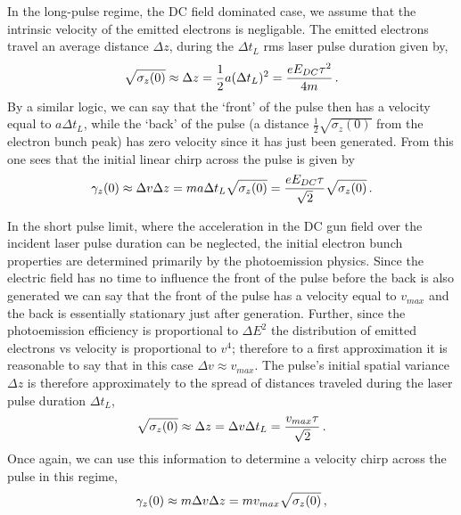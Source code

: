 In the long-pulse regime, the DC field dominated case, we assume that the intrinsic velocity of the emitted electrons is negligable.
The emitted electrons travel an average distance $ \Delta z $, during the $ \Delta t_{ L } $ rms laser pulse duration given by,
\begin{equation}
  \sqrt{ \sigma_{ z } ( 0 ) } \approx \Delta z = \frac{ 1 }{ 2 } a ( \Delta t_{L} )^{ 2 }  = \frac{ e E_{ DC } \tau^{ 2 } }{ 4 m } \, \text{.}
\end{equation}
By a similar logic, we can say that the `front' of the pulse then has a velocity equal to $ a \Delta t_{ L } $, while the `back' of the pulse (a distance $ \frac{ 1 }{ 2 } \sqrt{ \sigma_{ z } ( 0 ) } $ from the electron bunch peak) has zero velocity since it has just been generated. From this one sees that the initial linear chirp across the pulse is given by 
\begin{equation}
  \gamma_{ z } ( 0 ) \approx \Delta v \Delta z = m a \Delta t_{ L } \sqrt{ \sigma_{ z } ( 0 ) } = \frac{ e E_{ DC } \tau }{ \sqrt{ 2 } }\sqrt{ \sigma_{ z } ( 0 ) } \, \text{.}
\end{equation} 

In the short pulse limit, where the acceleration in the DC gun field over the incident laser pulse duration can be neglected, the initial electron bunch properties are determined primarily by the photoemission physics.
Since the electric field has no time to influence the front of the pulse before the back is also generated we can say that the front of the pulse has a velocity equal to $v_{max}$ and the back is essentially stationary just after generation.
Further, since the photoemission efficiency is proportional to $\Delta E^2$ \cite{shalaev_electron_1994} the distribution of emitted electrons vs velocity is proportional to $v^4$; therefore to a first approximation it is reasonable to say that in this case $\Delta v \approx v_{max}$.
The pulse's initial spatial variance $\Delta z$ is therefore approximately to the spread of distances traveled during the laser pulse duration $\Delta t_L$,
\begin{equation} 
  \sqrt{ \sigma_{ z } ( 0 ) } \approx \Delta z = \Delta v \Delta t_{L} = \frac{ v_{max} \tau }{ \sqrt{ 2 } } \, \text{.}
\end{equation}
Once again, we can use this information to determine a velocity chirp across the pulse in this regime,
\begin{equation}
  \gamma_{ z } ( 0 ) \approx m \Delta v \Delta z = m v_{max} \sqrt{ \sigma_{ z } ( 0 ) } \, \text{,}
\end{equation}

